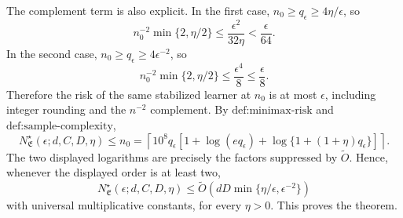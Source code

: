 The complement term is also explicit. In the first case, \(n_0\ge q_\epsilon\ge4\eta/\epsilon\), so
\[
n_0^{-2}\min\{2,\eta/2\}
\le\frac{\epsilon^2}{32\eta}<\frac\epsilon{64}.
\]
In the second case, \(n_0\ge q_\epsilon\ge4\epsilon^{-2}\), so
\[
n_0^{-2}\min\{2,\eta/2\}
\le\frac{\epsilon^4}{8}\le\frac\epsilon8.
\]
Therefore the risk of the same stabilized learner at \(n_0\) is at most \(\epsilon\), including integer rounding and the \(n^{-2}\) complement. By \(\text{def:minimax-risk}\) and \(\text{def:sample-complexity}\),
\[
N^\star_{\mathfrak E}(\epsilon;d,C,D,\eta)
\le n_0
=\left\lceil10^8q_\epsilon
\left[1+\log(eq_\epsilon)+\log\{1+(1+\eta)q_\epsilon\}\right]\right\rceil.
\]
The two displayed logarithms are precisely the factors suppressed by \(\widetilde O\). Hence, whenever the displayed order is at least two,
\[
N^\star_{\mathfrak E}(\epsilon;d,C,D,\eta)
\le\widetilde O\left(dD\min\{\eta/\epsilon,\epsilon^{-2}\}\right)
\]
with universal multiplicative constants, for every \(\eta>0\). This proves the theorem.